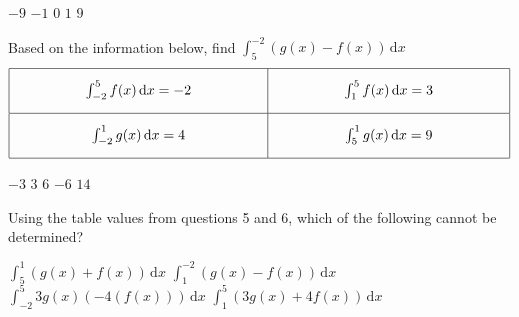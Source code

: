 \begin{questions}
    \begin{oneparchoices}
        \choice $-9$
        \choice $-1$
        \choice $0$
        \choice $1$
        \choice $9$
    \end{oneparchoices} \par \horizontalline

    \question Based on the information below, find $\int_5^{-2} (g(x) - f(x)) \,\mathrm{d}x$ \begin{align*}
        \arraycolsep=55pt\def\arraystretch{2.2} 
        \begin{array}[c]{|c|c|}
            \hline
            \int_{-2}^5 f(x) \,\mathrm{d}x = -2 & \int_1^5 f(x) \,\mathrm{d}x = 3 \\[5.5pt] \hline
            \int_{-2}^1 g(x) \,\mathrm{d}x = 4 & \int_5^1 g(x) \,\mathrm{d}x = 9 \\[5.5pt] 
            \hline
        \end{array}
    \end{align*}

    \begin{oneparchoices}
        \choice $-3$
        \choice $3$
        \choice $6$
        \choice $-6$
        \choice $14$
    \end{oneparchoices} \par \horizontalline

    \question Using the table values from questions 5 and 6, which of the following cannot be determined? \\

    \begin{oneparchoices}
        \choice $\int_5^1 (g(x) + f(x)) \,\mathrm{d}x$
        \makebox[0.30\textwidth] \choice $\int_1^{-2} (g(x) - f(x)) \,\mathrm{d}x$ \\[11pt]
        \makebox[0.035\textwidth] \choice $\int_{-2}^5 3g(x)(-4(f(x))) \,\mathrm{d}x$ 
        \makebox[0.26\textwidth] \choice $\int_1^5 (3g(x) + 4f(x)) \,\mathrm{d}x$ 
    \end{oneparchoices} \par \horizontalline
\end{questions}
